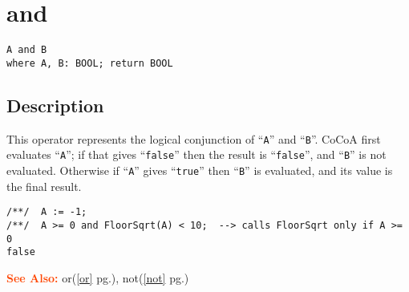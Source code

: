 \documentclass[a4paper]{mybook}
\newenvironment{command}{}{} %
\newcommand\SeeAlso{\par\textcolor{OrangeRed}{\textbf{\large See Also: }}}
\begin{document}
\section{and}
\label{and}
\begin{command} %


\begin{Verbatim}[label=syntax, rulecolor=\color{MidnightBlue},
frame=single]
A and B
where A, B: BOOL; return BOOL
\end{Verbatim}


\subsection*{Description}

This operator represents the logical conjunction of ``\verb&A&'' and ``\verb&B&''.
CoCoA first evaluates ``\verb&A&''; if that gives ``\verb&false&'' then the result
is ``\verb&false&'', and ``\verb&B&'' is not evaluated.  Otherwise if ``\verb&A&'' gives ``\verb&true&''
then ``\verb&B&'' is evaluated, and its value is the final result.
\begin{Verbatim}[label=example, rulecolor=\color{PineGreen}, frame=single]
/**/  A := -1;
/**/  A >= 0 and FloorSqrt(A) < 10;  --> calls FloorSqrt only if A >= 0
false
\end{Verbatim}


\SeeAlso %
  or(\ref{or} pg.\pageref{or}), 
    not(\ref{not} pg.\pageref{not})
\end{command} %
\end{document}
